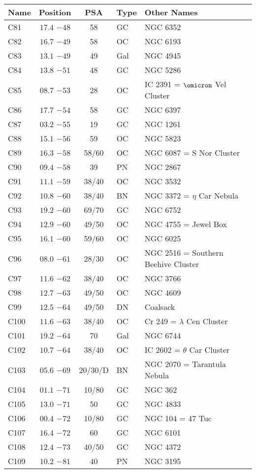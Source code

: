 \begin{table}[p]
\setlength{\tabcolsep}{3pt}
\small
\begin{tabular}{lcclll}
\hline
Name&Position&PSA&Type&Other Names\\
\hline
C81  &$17.4$ $-48$&58&GC &NGC 6352\\
C82  &$16.7$ $-49$&58&OC &NGC 6193\\
C83  &$13.1$ $-49$&49&Gal&NGC 4945\\
C84  &$13.8$ $-51$&48&GC &NGC 5286\\
C85  &$08.7$ $-53$&28&OC &IC 2391 = $\omicron$ Vel Cluster\\
C86  &$17.7$ $-54$&58&GC &NGC 6397\\
C87  &$03.2$ $-55$&19&GC &NGC 1261\\
C88  &$15.1$ $-56$&59&OC &NGC 5823\\
C89  &$16.3$ $-58$&58/60&OC &NGC 6087 = S Nor Cluster\\
C90  &$09.4$ $-58$&39&PN &NGC 2867\\
C91  &$11.1$ $-59$&38/40&OC &NGC 3532\\
C92  &$10.8$ $-60$&38/40&BN &NGC 3372 = $\eta$ Car Nebula\\
C93  &$19.2$ $-60$&69/70&GC &NGC 6752\\
C94  &$12.9$ $-60$&49/50&OC &NGC 4755 = Jewel Box\\
C95  &$16.1$ $-60$&59/60&OC &NGC 6025\\
C96  &$08.0$ $-61$&28/30&OC &NGC 2516 = Southern Beehive Cluster\\
C97  &$11.6$ $-62$&38/40&OC &NGC 3766\\
C98  &$12.7$ $-63$&49/50&OC &NGC 4609\\
C99  &$12.5$ $-64$&49/50&DN &Coalsack\\
C100 &$11.6$ $-63$&38/40&OC &Cr 249 = $\lambda$ Cen Cluster\\
C101 &$19.2$ $-64$&70&Gal&NGC 6744\\
C102 &$10.7$ $-64$&38/40&OC &IC 2602 = $\theta$ Car Cluster\\
C103 &$05.6$ $-69$&20/30/D&BN &NGC 2070 = Tarantula Nebula\\
C104 &$01.1$ $-71$&10/80&GC &NGC 362\\
C105 &$13.0$ $-71$&50&GC &NGC 4833\\
C106 &$00.4$ $-72$&10/80&GC &NGC 104 = 47 Tuc\\
C107 &$16.4$ $-72$&60&GC &NGC 6101\\
C108 &$12.4$ $-73$&40/50&GC &NGC 4372\\
C109 &$10.2$ $-81$&40&PN &NGC 3195\\
\hline
\end{tabular}
\end{table}

